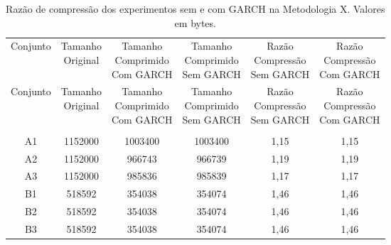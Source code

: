 \begin{center}
\begin{longtable}{cccccc}
\toprule
\rowcolor{white}
\caption[Metodologia X: Razão de compressão]{Razão de compressão dos
experimentos sem e com GARCH na Metodologia X.
Valores em bytes.} \label{Tab:razaocompressaoMet} \\
\midrule
Conjunto & \specialcell{Tamanho \\Original} & \specialcell{Tamanho
\\Comprimido\\Com GARCH} & \specialcell{Tamanho
\\Comprimido\\Sem GARCH} & \specialcell{Razão \\Compressão
\\Sem GARCH} & \specialcell{Razão \\Compressão
\\Com GARCH} \\
\midrule
\endfirsthead
\midrule
\rowcolor{white}
Conjunto & \specialcell{Tamanho \\Original} & \specialcell{Tamanho
\\Comprimido\\Com GARCH} & \specialcell{Tamanho
\\Comprimido\\Sem GARCH} & \specialcell{Razão \\Compressão
\\Sem GARCH} & \specialcell{Razão \\Compressão
\\Com GARCH} \\
\toprule
\endhead
\midrule \\ %
\endfoot
\bottomrule
\endlastfoot
A1    & 1152000 & 1003400 & 1003400 & 1,15  & 1,15 \\
A2    & 1152000 & 966743 & 966739 & 1,19  & 1,19 \\
A3    & 1152000 & 985836 & 985839 & 1,17  & 1,17 \\
B1    & 518592 & 354038 & 354074 & 1,46  & 1,46 \\
B2    & 518592 & 354038 & 354074 & 1,46  & 1,46 \\
B3    & 518592 & 354038 & 354074 & 1,46  & 1,46 \\

\end{longtable}
\end{center}

